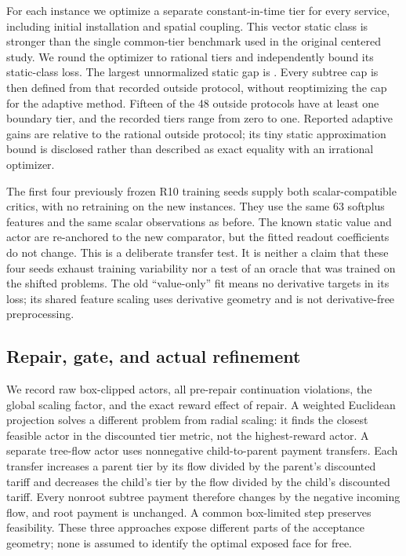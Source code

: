 For each instance we optimize a separate constant-in-time tier for every service, including initial installation and spatial coupling. This vector static class is stronger than the single common-tier benchmark used in the original centered study. We round the optimizer to rational tiers and independently bound its static-class loss. The largest unnormalized static gap is \RtwStaticGap. Every subtree cap is then defined from that recorded outside protocol, without reoptimizing the cap for the adaptive method. Fifteen of the 48 outside protocols have at least one boundary tier, and the recorded tiers range from zero to one. Reported adaptive gains are relative to the rational outside protocol; its tiny static approximation bound is disclosed rather than described as exact equality with an irrational optimizer.

The first four previously frozen R10 training seeds supply both scalar-compatible critics, with no retraining on the new instances. They use the same 63 softplus features and the same scalar observations as before. The known static value and actor are re-anchored to the new comparator, but the fitted readout coefficients do not change. This is a deliberate transfer test. It is neither a claim that these four seeds exhaust training variability nor a test of an oracle that was trained on the shifted problems. The old ``value-only'' fit means no derivative targets in its loss; its shared feature scaling uses derivative geometry and is not derivative-free preprocessing.

\subsection{Repair, gate, and actual refinement}
We record raw box-clipped actors, all pre-repair continuation violations, the global scaling factor, and the exact reward effect of repair. A weighted Euclidean projection solves a different problem from radial scaling: it finds the closest feasible actor in the discounted tier metric, not the highest-reward actor. A separate tree-flow actor uses nonnegative child-to-parent payment transfers. Each transfer increases a parent tier by its flow divided by the parent's discounted tariff and decreases the child's tier by the flow divided by the child's discounted tariff. Every nonroot subtree payment therefore changes by the negative incoming flow, and root payment is unchanged. A common box-limited step preserves feasibility. These three approaches expose different parts of the acceptance geometry; none is assumed to identify the optimal exposed face for free.

